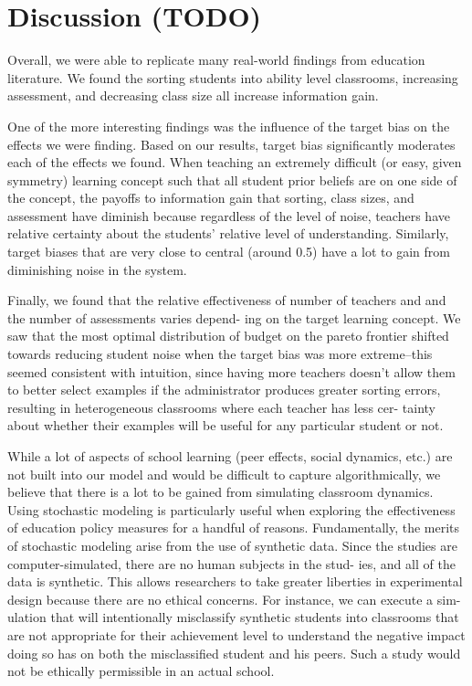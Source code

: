 \documentclass[10pt, letterpaper]{article}
\begin{document}
\section{Discussion (TODO)}\label{discussion-todo}

Overall, we were able to replicate many real-world findings from
education literature. We found the sorting students into ability level
classrooms, increasing assessment, and decreasing class size all
increase information gain.

One of the more interesting findings was the influence of the target
bias on the effects we were finding. Based on our results, target bias
significantly moderates each of the effects we found. When teaching an
extremely difficult (or easy, given symmetry) learning concept such that
all student prior beliefs are on one side of the concept, the payoffs to
information gain that sorting, class sizes, and assessment have diminish
because regardless of the level of noise, teachers have relative
certainty about the students' relative level of understanding.
Similarly, target biases that are very close to central (around 0.5)
have a lot to gain from diminishing noise in the system.

Finally, we found that the relative effectiveness of number of teachers
and and the number of assessments varies depend- ing on the target
learning concept. We saw that the most optimal distribution of budget on
the pareto frontier shifted towards reducing student noise when the
target bias was more extreme--this seemed consistent with intuition,
since having more teachers doesn't allow them to better select examples
if the administrator produces greater sorting errors, resulting in
heterogeneous classrooms where each teacher has less cer- tainty about
whether their examples will be useful for any particular student or not.

While a lot of aspects of school learning (peer effects, social
dynamics, etc.) are not built into our model and would be difficult to
capture algorithmically, we believe that there is a lot to be gained
from simulating classroom dynamics. Using stochastic modeling is
particularly useful when exploring the effectiveness of education policy
measures for a handful of reasons. Fundamentally, the merits of
stochastic modeling arise from the use of synthetic data. Since the
studies are computer-simulated, there are no human subjects in the stud-
ies, and all of the data is synthetic. This allows researchers to take
greater liberties in experimental design because there are no ethical
concerns. For instance, we can execute a sim- ulation that will
intentionally misclassify synthetic students into classrooms that are
not appropriate for their achievement level to understand the negative
impact doing so has on both the misclassified student and his peers.
Such a study would not be ethically permissible in an actual school.
\end{document}
